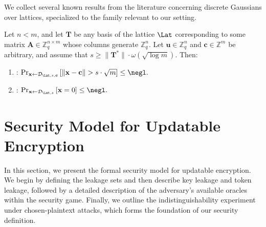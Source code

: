 \documentclass{fundam}
\begin{document}

\bigskip

We collect several known results from the literature concerning discrete Gaussians over lattices, specialized to the family relevant to our setting.
\begin{lemma}\label{lem::02}
	Let $n < m$, and let $\mathbf{T}$ be any basis of the lattice $\Lat$ corresponding to some matrix $\mathbf{A} \in \mathbb{Z}_q^{n \times m}$ whose columns generate $\mathbb{Z}_q^n$. Let $\mathbf{u} \in \mathbb{Z}_q^n$ and $\mathbf{c} \in \mathbb{Z}^m$ be arbitrary, and assume that $s \geq \| \mathbf{T}^* \| \cdot \omega\left( \sqrt{\log m} \right)$. Then:
	
	\begin{enumerate}
		\item {\normalfont \cite{micciancio2007worst,cash2012bonsai}:} 
		$\Pr_{\mathbf{x} \gets \mathcal{D}_{\Lat, s, \mathbf{c}}} \left[ \| \mathbf{x} - \mathbf{c} \| > s \cdot \sqrt{m} \right] \leq \negl.$
		\item {\normalfont \cite{peikert2006efficient,cash2012bonsai}:} 
		$\Pr_{\mathbf{x} \gets \mathcal{D}_{\Lat, s}} \left[ \mathbf{x} = 0 \right] \leq \negl.$
	\end{enumerate}
\end{lemma}


\section{Security Model for Updatable Encryption}
In this section, we present the formal security model for updatable encryption. We begin by defining the leakage sets and then describe key leakage and token leakage, followed by a detailed description of the adversary’s available oracles within the security game. Finally, we outline the indistinguishability experiment under chosen-plaintext attacks, which forms the foundation of our security definition.
\end{document}
